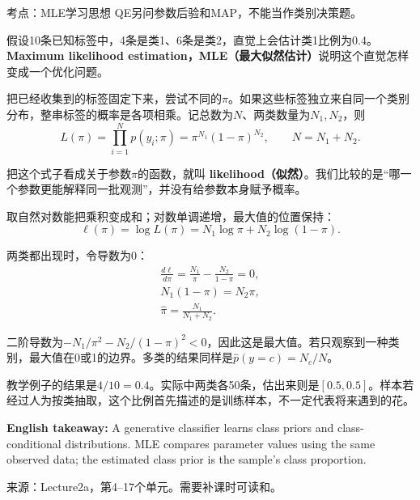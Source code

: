 

考点：MLE学习思想
 
QE另问参数后验和MAP，不能当作类别决策题。

假设10条已知标签中，4条是类1、6条是类2，直觉上会估计类1比例为0.4。\textbf{Maximum likelihood estimation，MLE（最大似然估计）}说明这个直觉怎样变成一个优化问题。


把已经收集到的标签固定下来，尝试不同的\(\pi\)。如果这些标签独立来自同一个类别分布，整串标签的概率是各项相乘。记总数为\(N\)、两类数量为\(N_1,N_2\)，则
\[
L(\pi)=\prod_{i=1}^{N}p(y_i;\pi)=\pi^{N_1}(1-\pi)^{N_2},\qquad N=N_1+N_2.
\tag{2.4}
\]


把这个式子看成关于参数\(\pi\)的函数，就叫 \textbf{likelihood（似然）}。我们比较的是“哪一个参数更能解释同一批观测”，并没有给参数本身赋予概率。


取自然对数能把乘积变成和；对数单调递增，最大值的位置保持：
\[
\ell(\pi)=\log L(\pi)=N_1\log\pi+N_2\log(1-\pi).
\tag{2.5}
\]


两类都出现时，令导数为0：
\[
\begin{gathered}
\frac{d\ell}{d\pi}=\frac{N_1}{\pi}-\frac{N_2}{1-\pi}=0,\\[0.4em]
N_1(1-\pi)=N_2\pi,\\[0.4em]
\hat\pi=\frac{N_1}{N_1+N_2}.
\end{gathered}
\tag{2.6}
\]


二阶导数为\(-N_1/\pi^2-N_2/(1-\pi)^2\lt0\)，因此这是最大值。若只观察到一种类别，最大值在0或1的边界。多类的结果同样是\(\hat p(y=c)=N_c/N\)。


教学例子的结果是\(4/10=0.4\)。实际中两类各50条，估出来则是\([0.5,0.5]\)。样本若经过人为按类抽取，这个比例首先描述的是训练样本，不一定代表将来遇到的花。


\textbf{English takeaway:} A generative classifier learns class priors and class-conditional distributions. MLE compares parameter values using the same observed data; the estimated class prior is the sample's class proportion.


来源：Lecture2a，第4–17个单元。需要补课时可读和。






